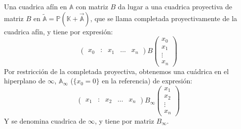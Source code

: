 \begin{definición}
    Una cuadrica afín en $\mathbb{A}$ con matriz $B$ da lugar a una cuadrica proyectiva de matriz $B$ en $\widetilde{\mathbb{A}} = \mathbb{P}( \mathbb{K} + \vec{\mathbb{A}} )$, que se llama completada proyectivamente de la cuadrica afín, y tiene por expresión:
    \[
    \begin{pmatrix}
        x_0 & : & x_1 & \ldots & x_n
    \end{pmatrix}
    B
    \begin{pmatrix}
        x_0 \\
        x_1 \\
        \vdots \\
        x_n
    \end{pmatrix}
    \]
    Por restricción de la completada proyectiva, obtenemos una cuádrica en el hiperplano de $\infty$, $\mathbb{A}_\infty$ ($\{ x_0 = 0 \}$ en la referencia) de expresión:
    \[
    \begin{pmatrix}
        x_1 & : & x_2 & \ldots & x_n
    \end{pmatrix}
    B_\infty
    \begin{pmatrix}
        x_1 \\
        x_2 \\
        \vdots \\
        x_n
    \end{pmatrix}
    \]
    Y se denomina cuadrica de $\infty$, y tiene por matriz $B_\infty$.
\end{definición}



